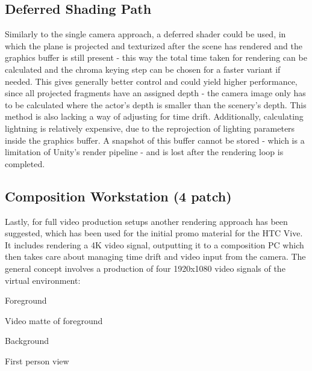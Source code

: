 \subsection{Deferred Shading Path}

Similarly to the single camera approach, a deferred shader could be used, in 
which the plane is projected and texturized after the scene has rendered and 
the graphics buffer is still present - this way the total time taken for 
rendering can be calculated and the chroma keying step can be chosen for a 
faster variant if needed. This gives generally better control and could yield 
higher performance, since all projected fragments have an assigned depth - the 
camera image only has to be calculated where the actor's depth is smaller than 
the scenery's depth. This method is also lacking a way of adjusting for time 
drift. Additionally, calculating lightning is relatively expensive, due to the 
reprojection of lighting parameters inside the graphics buffer. A snapshot of 
this buffer cannot be stored - which is a limitation of Unity's render pipeline 
- and is lost after the rendering loop is completed.

\subsection{Composition Workstation (4 patch)}

Lastly, for full video production setups another rendering approach has been 
suggested, which has been used for the initial promo material for the HTC 
Vive\cite{valve:vive-trailer:2016}. It includes rendering a 4K video signal, 
outputting it to a composition PC which then takes care about managing time 
drift and video input from the camera.
\newline
The general concept involves a production of four 1920x1080 video signals of 
the virtual environment:
\begin{my_list}
	\item Foreground
	\item Video matte of foreground
	\item Background
	\item First person view
\end{my_list}

